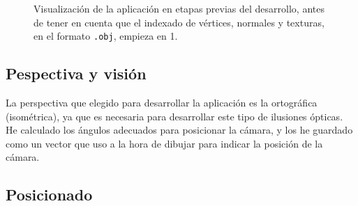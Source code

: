 \documentclass[a4paper,12pt]{article}
\begin{document}
\begin{figure}[h]
    \centering
    \caption{Visualización de la aplicación en etapas previas del desarrollo, antes de tener en cuenta que el indexado de vértices, normales y texturas, en el formato \texttt{.obj}, empieza en 1.} \label{antes_de_corregir_indexado}
\end{figure}

\subsection{Pespectiva y visión}

La perspectiva que elegido para desarrollar la aplicación es la ortográfica (isométrica), ya que es necesaria para desarrollar este tipo de ilusiones ópticas. He calculado los ángulos adecuados para posicionar la cámara, y los he guardado como un vector que uso a la hora de dibujar para indicar la posición de la cámara.

\subsection{Posicionado} \label{posicion}
\end{document}
